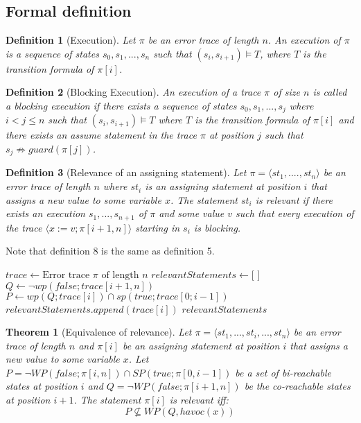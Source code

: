 \documentclass{article}
\newcommand{\limp}{\Rightarrow}
\newtheorem{mydef}{Definition}
\newtheorem{theorem}{Theorem}
\begin{document}
\subsection{Formal definition}
\begin{mydef}[Execution]\label{mydef:execution}
Let $\pi$ be an error trace of length $n$. An execution of $\pi$ is a sequence of states $s_0, s_1,...,s_n$ such that $(s_i, s_{i+1}) \vDash T$, where $T$ is the transition formula of $\pi[i]$.
\end{mydef}
\begin{mydef}[Blocking Execution]\label{mydef:blocked_execution}
An execution of a trace $\pi$ of size $n$ is called a \emph{blocking execution} if there exists a sequence of states $s_0,s_1,...,s_j$ where $i<j \leq n$ such that $(s_i, s_{i+1}) \vDash T$ where $T$ is the transition formula of $\pi[i]$ and there exists an assume statement in the trace $\pi$ at position $j$ such that $s_j \not \limp guard(\pi[j])$. 
\end{mydef}
\begin{mydef}[Relevance of an assigning statement]\label{mydef:responsible}
Let $\pi = \langle st_1,....,st_n \rangle$ be an error trace of length $n$ where $st_i$ is an assigning statement at position $i$ that assigns a new value to some variable $x$. The statement $st_i$ is relevant if there exists an execution $s_1,...,s_{n+1}$ of $\pi$ and some value $v$ such that every execution of the trace $\langle x:=v; \pi[i+1,n] \rangle$ starting in $s_i$ is blocking.
\end{mydef}

Note that definition 8 is the same as definition 5.
\begin{algorithm}
\caption{Relevance of an assigning statement}\label{relevance}
\begin{algorithmic}[1]
\State $trace \gets \text{Error trace } \pi \text{ of length } \textit{n}$
\State $relevantStatements \gets \text{[ ]}$
\State $Q \gets \neg wp(false;trace[i+1,n])$
\State $P \gets wp(Q; trace[i]) \cap sp(true; trace[0;i-1])$
\State $relevantStatements.append(trace[i])$
\EndIf
\EndFor
\Return $relevantStatements$
\EndProcedure
\end{algorithmic}
\end{algorithm}
\begin{theorem}[Equivalence of relevance]\label{mydef:relevancytheorem}
Let $\pi = \langle st_1,...,st_i,...,st_n \rangle$ be an error trace of length $n$ and $\pi[i]$ be an assigning statement at position $i$ that assigns a new value to some variable $x$. Let $P = \neg WP(false; \pi[i,n]) \cap SP(true; \pi[0,i-1])$ be a set of bi-reachable states at position $i$ and $Q =  \neg WP(false; \pi[i+1,n])$ be the co-reachable states at position $i+1$. The statement $\pi[i]$ is relevant iff:
 $$P \not \subseteq WP(Q,havoc(x))$$
\end{theorem}
\end{document}
